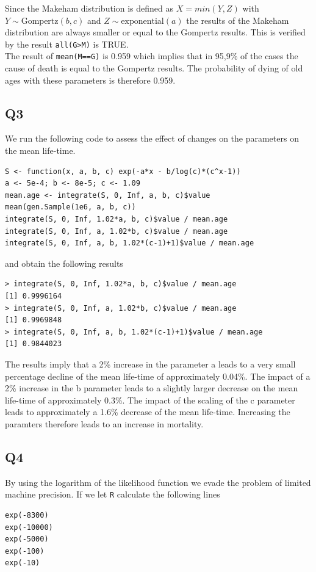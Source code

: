 Since the Makeham distribution is defined as $X = min(Y,Z)$ with $Y \sim \text{Gompertz}(b,c)$ and $Z \sim \text{exponential}(a)$ the results of the Makeham distribution are always smaller or equal to the Gompertz results. This is verified by the result \verb+all(G>M)+ is TRUE. \\
The result of \verb+mean(M==G)+ is 0.959 which implies that in 95,9\% of the cases the cause of death is equal to the Gompertz results. The probability of dying of old ages with these parameters is therefore 0.959.

\subsection*{Q3}
We run the following code to assess the effect of changes on the parameters on the mean life-time.
\begin{verbatim}
S <- function(x, a, b, c) exp(-a*x - b/log(c)*(c^x-1))
a <- 5e-4; b <- 8e-5; c <- 1.09
mean.age <- integrate(S, 0, Inf, a, b, c)$value 
mean(gen.Sample(1e6, a, b, c))
integrate(S, 0, Inf, 1.02*a, b, c)$value / mean.age
integrate(S, 0, Inf, a, 1.02*b, c)$value / mean.age
integrate(S, 0, Inf, a, b, 1.02*(c-1)+1)$value / mean.age
\end{verbatim}
and obtain the following results
\begin{verbatim}
> integrate(S, 0, Inf, 1.02*a, b, c)$value / mean.age
[1] 0.9996164
> integrate(S, 0, Inf, a, 1.02*b, c)$value / mean.age
[1] 0.9969848
> integrate(S, 0, Inf, a, b, 1.02*(c-1)+1)$value / mean.age
[1] 0.9844023
\end{verbatim}
The results imply that a 2\% increase in the parameter a leads to a very small percentage decline of the mean life-time of approximately 0.04\%. The impact of a 2\% increase in the b parameter leads to a slightly larger decrease on the mean life-time of approximately 0.3\%. The impact of the scaling of the c parameter leads to approximately a 1.6\% decrease of the mean life-time. Increasing the paramters therefore leads to an increase in mortality.

\subsection*{Q4}

By using the logarithm of the likelihood function we evade the problem of limited machine precision. If we let \verb|R| calculate the following lines

\begin{verbatim}
exp(-8300)
exp(-10000)
exp(-5000)
exp(-100)
exp(-10)
\end{verbatim}

